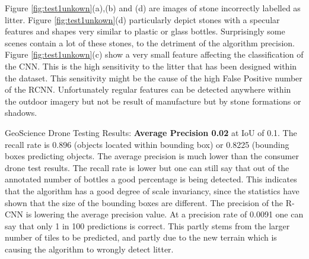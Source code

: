 \documentclass{article}
\begin{document}
\begin{enumerate}
Figure \ref{fig:test1unkown}(a),(b) and (d) are images of stone incorrectly labelled as litter. Figure \ref{fig:test1unkown}(d) particularly depict stones with a specular features and shapes very similar to plastic or glass bottles. Surprisingly some scenes contain a lot of these stones, to the detriment of the algorithm precision. Figure \ref{fig:test1unkown}(c) show a very small feature affecting the classification of the CNN. This is the high sensitivity to the litter that has been designed within the dataset. This sensitivity might be the cause of the high False Positive number of the RCNN. Unfortunately regular features can be detected anywhere within the outdoor imagery but not be result of manufacture but by stone formations or shadows. \newline
\end{enumerate}


GeoScience Drone Testing Results: \textbf{Average Precision 0.02} at IoU of 0.1. The recall rate is 0.896 (objects located within bounding box) or 0.8225 (bounding boxes predicting objects. The average precision is much lower than the consumer drone test results. The recall rate is lower but one can still say that out of the annotated number of bottles a good percentage is being detected. This indicates that the algorithm has a good degree of scale invariancy, since the statistics have shown that the size of the bounding boxes are different. The precision of the R-CNN is lowering the average precision value. At a precision rate of 0.0091 one can say that only 1 in 100 predictions is correct. This partly stems from the larger number of tiles to be predicted, and partly due to the new terrain which is causing the algorithm to wrongly detect litter.\newline 
\end{document}
